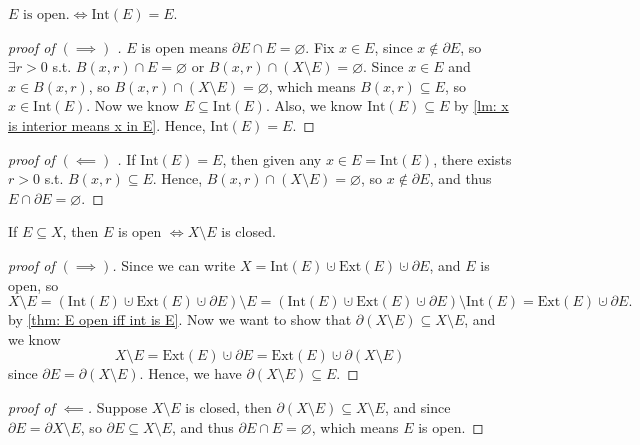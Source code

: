 \begin{theorem} \label{thm: E open iff int is E}
    \(E \text{ is open.} \iff \mathrm{Int}(E) = E \). 
\end{theorem}
\begin{proof}[proof of \((\implies )\) ]
    \(E\) is open means \(\partial E \cap E = \varnothing \). Fix \(x \in E\), since \(x \notin \partial E\), so \(\exists r > 0\) s.t. \(B(x,r) \cap E = \varnothing \) or \(B(x,r) \cap (X \setminus E) = \varnothing \). Since \(x \in E\) and \(x \in B(x,r)\), so \(B(x,r) \cap (X \setminus E) = \varnothing \), which means \(B(x,r) \subseteq E\), so \(x \in \mathrm{Int} (E)\). Now we know \(E \subseteq \mathrm{Int}(E) \). Also, we know \(\mathrm{Int}(E) \subseteq E \) by \autoref{lm: x is interior means x in E}. Hence, \(\mathrm{Int}(E) = E \).           
\end{proof}
\begin{proof}[proof of \((\impliedby )\) ]
    If \(\mathrm{Int}(E) = E \), then given any \(x \in E = \mathrm{Int}(E) \), there exists \(r>0\) s.t. \(B(x,r) \subseteq E\). Hence, \(B(x,r) \cap (X \setminus E) = \varnothing \), so \(x \notin \partial E\), and thus \(E \cap \partial E = \varnothing \).     
\end{proof}

\begin{theorem} \label{thm: E open iff X--E closed}
    If \(E \subseteq X\), then \(E\) is open \(\iff X \setminus E\) is closed.  
\end{theorem}
\begin{proof}[proof of \((\implies )\)]
    Since we can write \(X = \mathrm{Int}(E) \cupdot \mathrm{Ext}(E) \cupdot \partial E\), and \(E\) is open, so 
    \[
        X \setminus E = (\mathrm{Int}(E) \cupdot \mathrm{Ext}(E) \cupdot \partial E) \setminus E = (\mathrm{Int}(E) \cupdot \mathrm{Ext}(E) \cupdot \partial E) \setminus \mathrm{Int}(E) = \mathrm{Ext}(E) \cupdot \partial E.
    \] by \autoref{thm: E open iff int is E}. Now we want to show that \(\partial (X \setminus E) \subseteq X \setminus E\), and we know 
    \[
        X \setminus E = \mathrm{Ext}(E) \cupdot \partial E = \mathrm{Ext}(E) \cupdot \partial (X \setminus E)  
    \] since \(\partial E = \partial (X \setminus E)\). Hence, we have \(\partial (X \setminus E) \subseteq E\).  
\end{proof}
\begin{proof}[proof of \(\impliedby \)]
    Suppose \(X \setminus E\) is closed, then \(\partial (X \setminus E) \subseteq X \setminus E\), and since \(\partial E = \partial X \setminus E\), so \(\partial E \subseteq X \setminus E\), and thus \(\partial E \cap E = \varnothing\), which means \(E\) is open.     
\end{proof}